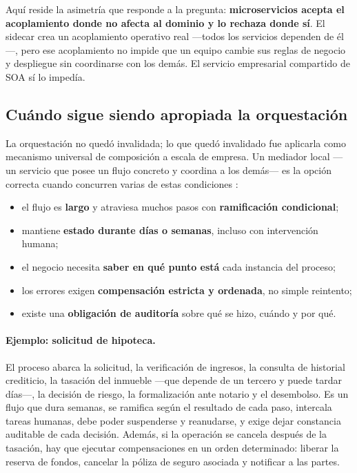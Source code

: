 Aquí reside la asimetría que responde a la pregunta: \textbf{microservicios acepta el acoplamiento donde no afecta al dominio y lo rechaza donde sí}. El sidecar crea un acoplamiento operativo real ---todos los servicios dependen de él---, pero ese acoplamiento no impide que un equipo cambie sus reglas de negocio y despliegue sin coordinarse con los demás. El servicio empresarial compartido de SOA sí lo impedía.

\subsection{Cuándo sigue siendo apropiada la orquestación}

La orquestación no quedó invalidada; lo que quedó invalidado fue aplicarla como mecanismo universal de composición a escala de empresa. Un mediador local ---un servicio que posee un flujo concreto y coordina a los demás--- es la opción correcta cuando concurren varias de estas condiciones \parencite{fordhardparts2021}:

\begin{itemize}[leftmargin=1.5em]
  \item el flujo es \textbf{largo} y atraviesa muchos pasos con \textbf{ramificación condicional};
  \item mantiene \textbf{estado durante días o semanas}, incluso con intervención humana;
  \item el negocio necesita \textbf{saber en qué punto está} cada instancia del proceso;
  \item los errores exigen \textbf{compensación estricta y ordenada}, no simple reintento;
  \item existe una \textbf{obligación de auditoría} sobre qué se hizo, cuándo y por qué.
\end{itemize}

\paragraph{Ejemplo: solicitud de hipoteca.} El proceso abarca la solicitud, la verificación de ingresos, la consulta de historial crediticio, la tasación del inmueble ---que depende de un tercero y puede tardar días---, la decisión de riesgo, la formalización ante notario y el desembolso. Es un flujo que dura semanas, se ramifica según el resultado de cada paso, intercala tareas humanas, debe poder suspenderse y reanudarse, y exige dejar constancia auditable de cada decisión. Además, si la operación se cancela después de la tasación, hay que ejecutar compensaciones en un orden determinado: liberar la reserva de fondos, cancelar la póliza de seguro asociada y notificar a las partes.

